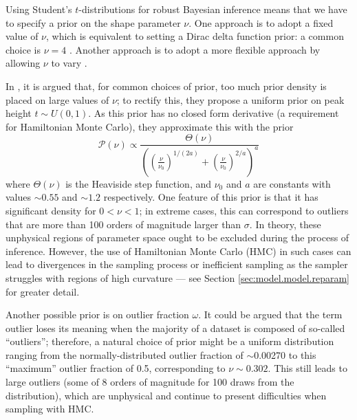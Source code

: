\documentclass[fleqn,usenatbib]{mnras}
\begin{document}


Using Student's $t$-distributions for robust Bayesian inference means that we
have to specify a prior on the shape parameter $\nu$. One approach is to adopt a
fixed value of $\nu$, which is equivalent to setting a Dirac delta function
prior: a common choice is $\nu = 4$ \citep[e.g.][]{Berger:1994, Gelman:2013}.
Another approach is to adopt a more flexible approach by allowing $\nu$ to vary
\citep[e.g.][]{Juarez:2010, Park:2017, Feeney:2018}.

In \citet{Feeney:2018}, it is argued that, for common choices of prior, too
much prior density is placed on large values of $\nu$; to rectify this, they
propose a uniform prior on peak height $t \sim U\left(0, 1\right)$. As this
prior has no closed form derivative (a requirement for Hamiltonian Monte Carlo),
they approximate this with the prior
\begin{equation}
    \mathcal P\left(\nu\right) \propto
    \frac{
        \Theta(\nu)
    }{
        \left(
            \left(\frac{\nu}{\nu_0}\right)^{1 / (2 a)}
            + \left(\frac{\nu}{\nu_0}\right)^{2 / a}
        \right)^a
    }
\end{equation}
where $\Theta(\nu)$ is the Heaviside step function, and $\nu_0$ and $a$ are
constants with values $\sim 0.55$ and $\sim 1.2$ respectively.  One feature of
this prior is that it has significant density for $0 < \nu < 1$; in extreme
cases, this can correspond to outliers that are more than 100 orders of
magnitude larger than $\sigma$. In theory, these unphysical regions of parameter
space ought to be excluded during the process of inference. However, the use of
Hamiltonian Monte Carlo (HMC) in such cases can lead to divergences in the
sampling process or inefficient sampling as the sampler struggles with regions
of high curvature --- see Section \ref{sec:model.model.reparam} for greater
detail.

Another possible prior is on outlier fraction $\omega$. It could be argued that
the term outlier loses its meaning when the majority of a dataset is composed of
so-called ``outliers''; therefore, a natural choice of prior might be a uniform
distribution ranging from the normally-distributed outlier fraction of
$\sim$0.00270 to this ``maximum'' outlier fraction of 0.5, corresponding to $\nu
\sim 0.302$. This still leads to large outliers (some of 8 orders of magnitude
for 100 draws from the distribution), which are unphysical and continue to
present difficulties when sampling with HMC.
\end{document}

